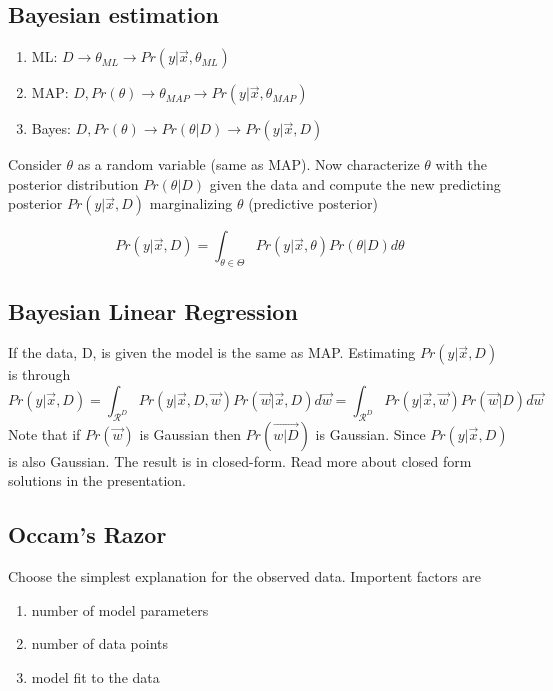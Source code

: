 \documentclass[12pt]{article}
\numberwithin{equation}{section}
\begin{document}
\subsection{Bayesian estimation}
\begin{enumerate}
\item ML: $D \to \theta_{ML} \to Pr(y | \vec{x}, \theta_{ML})$
\item MAP: $D, Pr(\theta) \to \theta_{MAP} \to Pr(y | \vec{x}, \theta_{MAP})$
\item Bayes: $D, Pr(\theta)  \to Pr(\theta | D) \to Pr(y | \vec{x},D)$

\end{enumerate}
Consider $\theta$ as a random variable (same as MAP). Now characterize $\theta$ with the posterior distribution $Pr(\theta | D)$ given the data and compute the new predicting posterior $Pr(y|\vec{x}, D)$ marginalizing $\theta$  (predictive posterior)

\begin{equation}
Pr(y|\vec{x}, D) = \int_{\theta \in \Theta} Pr(y|\vec{x}, \theta) Pr(\theta | D) d\theta
\end{equation}

\subsection{Bayesian Linear Regression}
If the data, D, is given the model is the same as MAP. Estimating $Pr(y | \vec{x}, D)$ is through
\begin{equation}
Pr(y | \vec{x}, D) = \int_{\mathcal{R}^D} Pr(y | \vec{x},D, \vec{w})Pr(\vec{w}|\vec{x},D) d\vec{w} = \int_{\mathcal{R}^D} Pr(y | \vec{x}, \vec{w})Pr(\vec{w}| D) d\vec{w}
\end{equation}
Note that if $Pr(\vec{w})$ is Gaussian then $Pr(\vec{w | D})$ is Gaussian. Since $Pr(y|\vec{x},D )$ is also Gaussian. The result is in closed-form. Read more about closed form solutions in the presentation.

\subsection{Occam's Razor}
Choose the simplest explanation for the observed data. Importent factors are
\begin{enumerate}
\item number of model parameters
\item number of data points 
\item model fit to the data
\end{enumerate}
\end{document}
